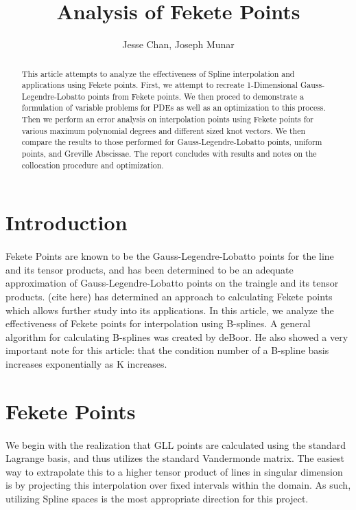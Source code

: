 \documentclass{article}
\title{Analysis of Fekete Points}
\author{Jesse Chan, Joseph Munar}
\date{}
\begin{document}
\maketitle
\nopagebreak
\begin{abstract}
This article attempts to analyze the effectiveness of Spline interpolation and applications using Fekete points. First, we attempt to recreate 1-Dimensional Gauss-Legendre-Lobatto points from Fekete points. We then proced to demonstrate a formulation of variable problems for PDEs as well as an optimization to this process. Then we perform an error analysis on interpolation points using Fekete points for various maximum polynomial degrees and different sized knot vectors. We then compare the results to those performed for Gauss-Legendre-Lobatto points, uniform points, and Greville Abscissae. The report concludes with results and notes on the collocation procedure and optimization.
\end{abstract}
\section*{Introduction}
\paragraph{}
Fekete Points are known to be the Gauss-Legendre-Lobatto points for the line and its tensor products, and has been determined to be an adequate approximation of Gauss-Legendre-Lobatto points on the traingle and its tensor products. (cite here) has determined an approach to calculating Fekete points which allows further study into its applications. In this article, we analyze the effectiveness of Fekete points for interpolation using B-splines. A general algorithm for calculating B-splines was created by deBoor. He also showed a very important note for this article: that the condition number of a B-spline basis increases exponentially as K increases.

\section*{Fekete Points}
\paragraph{}
We begin with the realization that GLL points are calculated using the standard Lagrange basis, and thus utilizes the standard Vandermonde matrix. The easiest way to extrapolate this to a higher tensor product of lines in singular dimension is by projecting this interpolation over fixed intervals within the domain. As such, utilizing Spline spaces is the most appropriate direction for this project.
\end{document}

